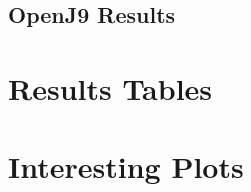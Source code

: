 \documentclass[a4paper]{article}
\newcommand{\graalce}{\textsc{Graal CE}\xspace}
\newcommand{\graalcehs}{\textsc{Graal CE Hotspot}\xspace}
\newcommand{\jnine}{\textsc{OpenJ9}\xspace}
\newcommand{\bencherseven}{Linux$_\mathrm{1240v5}$\xspace}
\newcommand{\bencherten}{Linux$_\mathrm{1240v6}$\xspace}
\begin{document}
\subsection{OpenJ9 Results}





\appendix

\section{Results Tables}


\newcommand{\captionbsevengraalce}{Results for \graalce on \bencherseven.}


\newpage
\newcommand{\captionbsevengraalcehs}{Results for \graalcehs on \bencherseven.}


\newpage
\newcommand{\captionbsevenjnine}{Results for \jnine on \bencherseven.}


\newpage
\newcommand{\captionbtengraalce}{Results for \graalce on \bencherten.}


\newpage
\newcommand{\captionbtengraalcehs}{Results for \graalcehs on \bencherten.}


\newpage
\newcommand{\captionbtenjnine}{Results for \jnine on \bencherten.}


\section{Interesting Plots}
\end{document}
